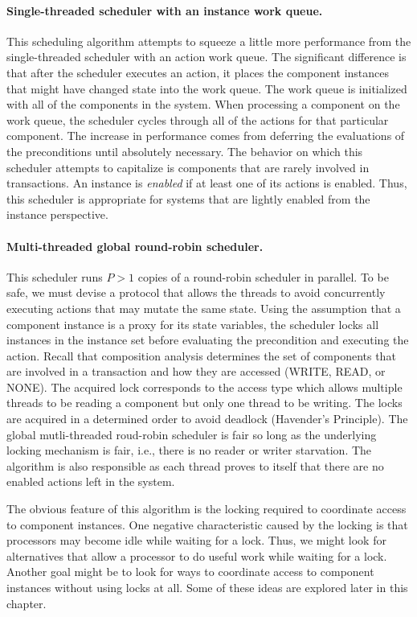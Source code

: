 \paragraph{Single-threaded scheduler with an instance work queue.}
This scheduling algorithm attempts to squeeze a little more performance from the single-threaded scheduler with an action work queue.
The significant difference is that after the scheduler executes an action, it places the component instances that might have changed state into the work queue.
The work queue is initialized with all of the components in the system.
When processing a component on the work queue, the scheduler cycles through all of the actions for that particular component.
The increase in performance comes from deferring the evaluations of the preconditions until absolutely necessary.
The behavior on which this scheduler attempts to capitalize is components that are rarely involved in transactions.
An instance is \emph{enabled} if at least one of its actions is enabled.
Thus, this scheduler is appropriate for systems that are lightly enabled from the instance perspective.

\paragraph{Multi-threaded global round-robin scheduler.}
This scheduler runs $P > 1$ copies of a round-robin scheduler in parallel.
To be safe, we must devise a protocol that allows the threads to avoid concurrently executing actions that may mutate the same state.
Using the assumption that a component instance is a proxy for its state variables, the scheduler locks all instances in the instance set before evaluating the precondition and executing the action.
Recall that composition analysis determines the set of components that are involved in a transaction and how they are accessed (WRITE, READ, or NONE).
The acquired lock corresponds to the access type which allows multiple threads to be reading a component but only one thread to be writing.
The locks are acquired in a determined order to avoid deadlock (Havender's Principle).
The global mutli-threaded roud-robin scheduler is fair so long as the underlying locking mechanism is fair, i.e., there is no reader or writer starvation.
The algorithm is also responsible as each thread proves to itself that there are no enabled actions left in the system.

The obvious feature of this algorithm is the locking required to coordinate access to component instances.
One negative characteristic caused by the locking is that processors may become idle while waiting for a lock.
Thus, we might look for alternatives that allow a processor to do useful work while waiting for a lock.
Another goal might be to look for ways to coordinate access to component instances without using locks at all.
Some of these ideas are explored later in this chapter.

